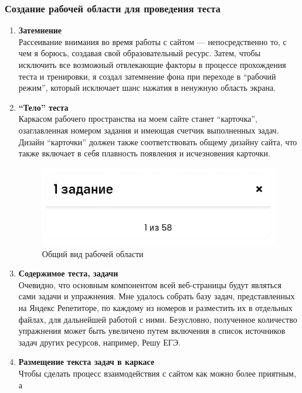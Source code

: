 \documentclass[a4paper, 12pt]{extarticle}
\begin{document}
\subsubsection{Создание рабочей области для проведения теста}
\begin{enumerate}
    \item {\textbf{Затемнение}}\\
    Рассеивание внимания во время работы с сайтом — непосредственно то, с чем я
    борюсь, создавая свой образовательный ресурс. Затем, чтобы исключить все
    возможный отвлекающие факторы в процессе прохождения теста и тренировки, я
    создал затемнение фона при переходе в \enquote{рабочий режим}, который исключает шанс
    нажатия в ненужную область экрана.
\vspace{2mm}
\item {\textbf{\enquote{Тело} теста}}\\
    Каркасом рабочего пространства на моем сайте станет \enquote{карточка},
    озаглавленная номером задания и имеющая счетчик выполненных задач. Дизайн
    \enquote{карточки} должен также соответствовать общему дизайну сайта, что
    также включает в себя плавность появления и исчезновения карточки.
    \begin{figure}[h]
        \centering
        \includegraphics[height=100pt]{./img/quizFrame.png}
        \caption{Общий вид рабочей области}
    \end{figure}
\item {\textbf{Содержимое теста, задачи}}\\
    Очевидно, что основным компонентом всей веб-страницы будут являться сами
    задачи и упражнения. Мне удалось собрать базу задач, представленных на
    Яндекс Репетиторе, по каждому из номеров и разместить их в отдельных
    файлах, для дальнейшей работой с ними.  Безусловно, полученное количество
    упражнения может быть увеличено путем включения в список источников задач
    других ресурсов, например, Решу ЕГЭ.
\vspace{2mm}
\item {\textbf{Размещение текста задач в каркасе}}\\
    Чтобы сделать процесс взаимодействия с сайтом как можно более приятным, а

\end{enumerate}
\end{document}
